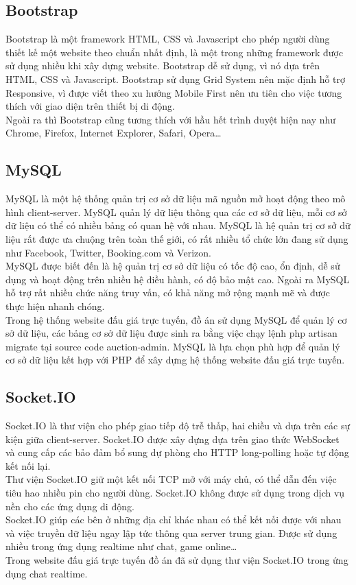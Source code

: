 \documentclass{article}
\begin{document}
\subsection{Bootstrap}
Bootstrap là một framework HTML, CSS và Javascript cho phép người dùng thiết kế một website theo chuẩn nhất định, là một trong những framework được sử dụng nhiều khi xây dựng website. Bootstrap dễ sử dụng, vì nó dựa trên HTML, CSS và Javascript. Bootstrap sử dụng Grid System nên mặc định hỗ trợ Responsive, vì được viết theo xu hướng Mobile First nên ưu tiên cho việc tương thích với giao diện trên thiết bị di động.\\
Ngoài ra thì Bootstrap cũng tương thích với hầu hết trình duyệt hiện nay như Chrome, Firefox, Internet Explorer, Safari, Opera…
\subsection{MySQL}
MySQL là một hệ thống quản trị cơ sở dữ liệu mã nguồn mở hoạt động theo mô hình client-server. MySQL quản lý dữ liệu thông qua các cơ sở dữ liệu, mỗi cơ sở dữ liệu có thể có nhiều bảng có quan hệ với nhau. MySQL là hệ quản trị cơ sở dữ liệu rất được ưa chuộng trên toàn thế giới, có rất nhiều tổ chức lớn đang sử dụng như Facebook, Twitter, Booking.com và Verizon. \\
MySQL được biết đến là hệ quản trị cơ sở dữ liệu có tốc độ cao, ổn định, dễ sử dụng và hoạt động trên nhiều hệ điều hành, có độ bảo mật cao. Ngoài ra MySQL hỗ trợ rất nhiều chức năng truy vấn, có khả năng mở rộng mạnh mẽ và được thực hiện nhanh chóng.\\
Trong hệ thống website đấu giá trực tuyến, đồ án sử dụng MySQL để quản lý cơ sở dữ liệu, các bảng cơ sở dữ liệu được sinh ra bằng việc chạy lệnh php artisan migrate tại source code auction-admin. MySQL là lựa chọn phù hợp để quản lý cơ sở dữ liệu kết hợp với PHP để xây dựng hệ thống website đấu giá trực tuyến.
\subsection{Socket.IO}
Socket.IO là thư viện cho phép giao tiếp độ trễ thấp, hai chiều và dựa trên các sự kiện giữa client-server. Socket.IO được xây dựng dựa trên giao thức WebSocket và cung cấp các bảo đảm bổ sung dự phòng cho HTTP long-polling hoặc tự động kết nối lại.\\ 
Thư viện Socket.IO giữ một kết nối TCP mở với máy chủ, có thể dẫn đến việc tiêu hao nhiều pin cho người dùng. Socket.IO không được sử dụng trong dịch vụ nền cho các ứng dụng di động. \\
Socket.IO giúp các bên ở những địa chỉ khác nhau có thể kết nối được với nhau và việc truyền dữ liệu ngay lập tức thông qua server trung gian. Được sử dụng nhiều trong ứng dụng realtime như chat, game online…\\
Trong website đấu giá trực tuyến đồ án đã sử dụng thư viện Socket.IO trong ứng dụng chat realtime.
\newpage
\end{document}

